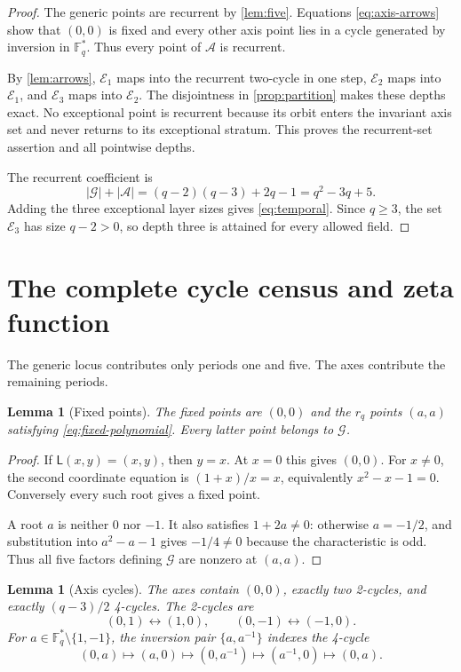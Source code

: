 \documentclass[10pt,a4paper]{amsart}
\newtheorem{lemma}[theorem]{Lemma}
\theoremstyle{definition}
\theoremstyle{remark}
\newcommand{\F}{\mathbb F}
\newcommand{\G}{\mathcal G}
\newcommand{\A}{\mathcal A}
\newcommand{\E}{\mathcal E}
\newcommand{\Lyn}{\mathsf L}
\begin{document}
\begin{proof}
The generic points are recurrent by \cref{lem:five}.  Equations
\eqref{eq:axis-arrows} show that $(0,0)$ is fixed and every other axis point
lies in a cycle generated by inversion in $\F_q^*$.  Thus every point of
$\A$ is recurrent.

By \cref{lem:arrows}, $\E_1$ maps into the recurrent two-cycle in one step,
$\E_2$ maps into $\E_1$, and $\E_3$ maps into $\E_2$.  The disjointness in
\cref{prop:partition} makes these depths exact.  No exceptional point is
recurrent because its orbit enters the invariant axis set and never returns
to its exceptional stratum.  This proves the recurrent-set assertion and all
pointwise depths.

The recurrent coefficient is
\[
 |\G|+|\A|=(q-2)(q-3)+2q-1=q^2-3q+5.
\]
Adding the three exceptional layer sizes gives \eqref{eq:temporal}.  Since
$q\geq3$, the set $\E_3$ has size $q-2>0$, so depth three is attained for
every allowed field.
\end{proof}

\section{The complete cycle census and zeta function}

The generic locus contributes only periods one and five.  The axes contribute
the remaining periods.

\begin{lemma}[Fixed points]\label{lem:fixed}
The fixed points are $(0,0)$ and the $r_q$ points $(a,a)$ satisfying
\eqref{eq:fixed-polynomial}.  Every latter point belongs to $\G$.
\end{lemma}

\begin{proof}
If $\Lyn(x,y)=(x,y)$, then $y=x$.  At $x=0$ this gives $(0,0)$.  For
$x\ne0$, the second coordinate equation is
$(1+x)/x=x$, equivalently $x^2-x-1=0$.  Conversely every such root gives a
fixed point.

A root $a$ is neither $0$ nor $-1$.  It also satisfies $1+2a\ne0$: otherwise
$a=-1/2$, and substitution into $a^2-a-1$ gives $-1/4\ne0$ because the
characteristic is odd.  Thus all five factors defining $\G$ are nonzero at
$(a,a)$.
\end{proof}

\begin{lemma}[Axis cycles]\label{lem:axis-cycles}
The axes contain $(0,0)$, exactly two 2-cycles, and exactly $(q-3)/2$
4-cycles.  The 2-cycles are
\begin{equation}\label{eq:two-cycles}
 (0,1)\longleftrightarrow(1,0),\qquad
 (0,-1)\longleftrightarrow(-1,0).
\end{equation}
For $a\in\F_q^*\setminus\{1,-1\}$, the inversion pair
$\{a,a^{-1}\}$ indexes the 4-cycle
\begin{equation}\label{eq:four-cycle}
 (0,a)\longmapsto(a,0)\longmapsto(0,a^{-1})
 \longmapsto(a^{-1},0)\longmapsto(0,a).
\end{equation}
\end{lemma}
\end{document}
